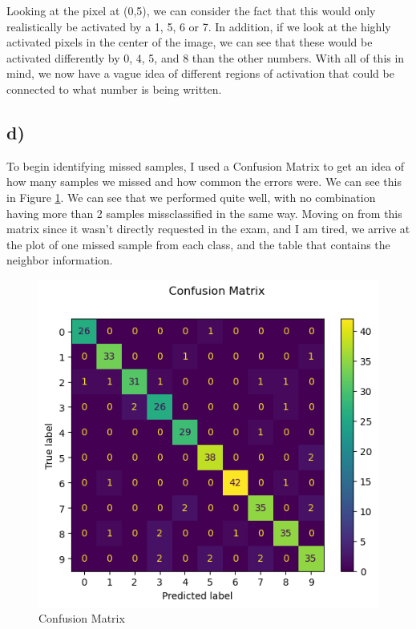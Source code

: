 \documentclass[12pt]{article}
\begin{document}
Looking at the pixel at (0,5), we can consider the fact that this would only realistically be activated by a 1, 5, 6 
or 7. In addition, if we look at the highly activated pixels in the center of the image, we can see that these would be 
activated differently by 0, 4, 5, and 8 than the other numbers. With all of this in mind, we now have a vague idea of 
different regions of activation that could be connected to what number is being written.

\subsection{d)}
To begin identifying missed samples, I used a Confusion Matrix to get an idea of how many samples we missed and how 
common the errors were. We can see this in Figure \ref{figure7}. We can see that we performed quite well, with no 
combination having more than 2 samples missclassified in the same way. Moving on from this matrix since it wasn't 
directly requested in the exam, and I am tired, we arrive at the plot of one missed sample from each class, and the table 
that contains the neighbor information.

\begin{figure}
  \includegraphics[width = \textwidth]{../results5/Digits_Confusion.png}
  \caption{Confusion Matrix}
  \label{figure7}
\end{figure}
\end{document}

